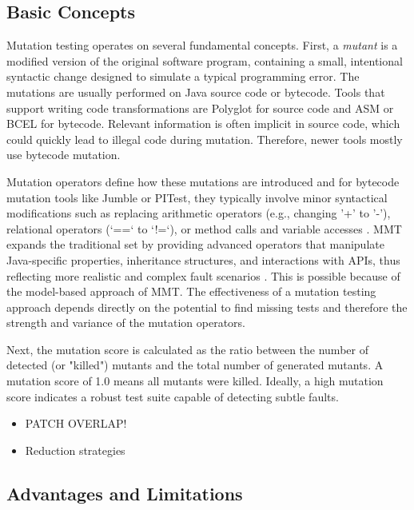 \documentclass[sigplan, nonacm]{acmart}
\begin{document}
\subsection{Basic Concepts}
Mutation testing operates on several fundamental concepts.
First, a \textit{mutant} is a modified version of the original software
program, containing a small, intentional syntactic change designed to simulate
a typical programming error. The mutations are usually performed on Java
source code or bytecode. Tools that support writing code transformations are
Polyglot for source code and ASM or BCEL for bytecode. Relevant information
is often implicit in source code, which could quickly lead to illegal code
during mutation. Therefore, newer tools mostly use bytecode mutation.

Mutation operators define how these mutations are introduced and for
bytecode mutation tools like Jumble or PITest, they typically involve minor
syntactical modifications such as replacing arithmetic operators (e.g.,
changing '+' to '-'), relational operators (`==` to `!=`), or method calls
and variable accesses \cite{offutt_mutation_2001}. MMT expands the
traditional set by providing advanced operators that manipulate Java-specific
properties, inheritance structures, and interactions with APIs, thus
reflecting more realistic and complex fault scenarios
\cite{bockisch_mmt_2024}. This is possible because of the model-based
approach of MMT\@. The effectiveness of a mutation testing approach depends
directly on the potential to find missing tests and therefore the strength
and variance of the mutation operators.

Next, the mutation score is calculated as the ratio between the number of
detected (or "killed") mutants and the total number of generated mutants. A
mutation score of 1.0 means all mutants were killed. Ideally, a high
mutation score indicates a robust test suite capable of detecting subtle
faults.

\begin{itemize}
	\item PATCH OVERLAP!
	\item Reduction strategies
\end{itemize}

\subsection{Advantages and Limitations}
\end{document}
